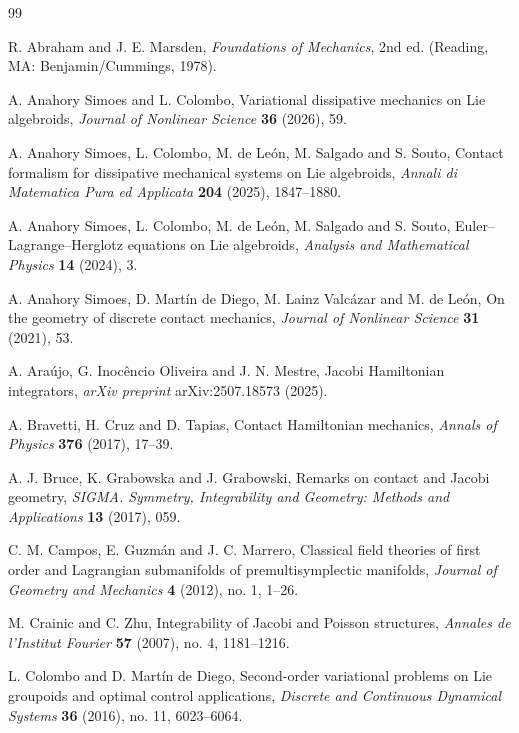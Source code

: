 \documentclass[11pt]{article}
\begin{document}
\begin{thebibliography}{99}

R. Abraham and J. E. Marsden,
\textit{Foundations of Mechanics},
2nd ed. (Reading, MA: Benjamin/Cummings, 1978).

A. Anahory Simoes and L. Colombo,
Variational dissipative mechanics on Lie algebroids,
\textit{Journal of Nonlinear Science}
\textbf{36} (2026), 59.

A. Anahory Simoes, L. Colombo, M. de Le\'on, M. Salgado and S. Souto,
Contact formalism for dissipative mechanical systems on Lie algebroids,
\textit{Annali di Matematica Pura ed Applicata}
\textbf{204} (2025), 1847--1880.

A. Anahory Simoes, L. Colombo, M. de Le\'on, M. Salgado and S. Souto,
Euler--Lagrange--Herglotz equations on Lie algebroids,
\textit{Analysis and Mathematical Physics}
\textbf{14} (2024), 3.

A. Anahory Simoes, D. Mart\'in de Diego, M. Lainz Valc\'azar and M. de Le\'on,
On the geometry of discrete contact mechanics,
\textit{Journal of Nonlinear Science}
\textbf{31} (2021), 53.

A. Ara\'ujo, G. Inoc\^encio Oliveira and J. N. Mestre,
Jacobi Hamiltonian integrators,
\textit{arXiv preprint} arXiv:2507.18573 (2025).

A. Bravetti, H. Cruz and D. Tapias,
Contact Hamiltonian mechanics,
\textit{Annals of Physics}
\textbf{376} (2017), 17--39.

A. J. Bruce, K. Grabowska and J. Grabowski,
Remarks on contact and Jacobi geometry,
\textit{SIGMA. Symmetry, Integrability and Geometry: Methods and Applications}
\textbf{13} (2017), 059.

C. M. Campos, E. Guzm\'an and J. C. Marrero,
Classical field theories of first order and Lagrangian submanifolds of premultisymplectic manifolds,
\textit{Journal of Geometry and Mechanics}
\textbf{4} (2012), no. 1, 1--26.

M. Crainic and C. Zhu,
Integrability of Jacobi and Poisson structures,
\textit{Annales de l'Institut Fourier}
\textbf{57} (2007), no. 4, 1181--1216.

L. Colombo and D. Mart\'in de Diego,
Second-order variational problems on Lie groupoids and optimal control applications,
\textit{Discrete and Continuous Dynamical Systems}
\textbf{36} (2016), no. 11, 6023--6064.


\end{thebibliography}
\end{document}
